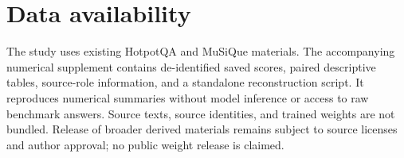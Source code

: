 \documentclass[preprint,12pt]{elsarticle}
\begin{document}
\section*{Data availability}
The study uses existing HotpotQA and MuSiQue materials. The accompanying numerical supplement contains de-identified saved scores, paired descriptive tables, source-role information, and a standalone reconstruction script. It reproduces numerical summaries without model inference or access to raw benchmark answers. Source texts, source identities, and trained weights are not bundled. Release of broader derived materials remains subject to source licenses and author approval; no public weight release is claimed.



\end{document}
